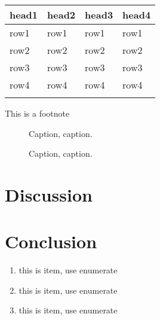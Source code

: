 \documentclass{bioinfo}
\begin{document}
\begin{methods}
\begin{table}[!t]
{\begin{tabular}{llll}\toprule
head1 & head2 & head3 & head4\\\midrule
row1 & row1 & row1 & row1\\
row2 & row2 & row2 & row2\\
row3 & row3 & row3 & row3\\
row4 & row4 & row4 & row4\\\botrule
\end{tabular}}{This is a footnote}
\end{table}

\end{methods}

\begin{figure}[!tpb]%
\caption{Caption, caption.}\label{fig:01}
\end{figure}

\begin{figure}[!tpb]%
\caption{Caption, caption.}\label{fig:02}
\end{figure}

\section{Discussion}
\label{sec::dis}










%
%






\section{Conclusion}
\label{sec::con}



\begin{enumerate}
\item this is item, use enumerate
\item this is item, use enumerate
\item this is item, use enumerate
\end{enumerate}
\end{document}
